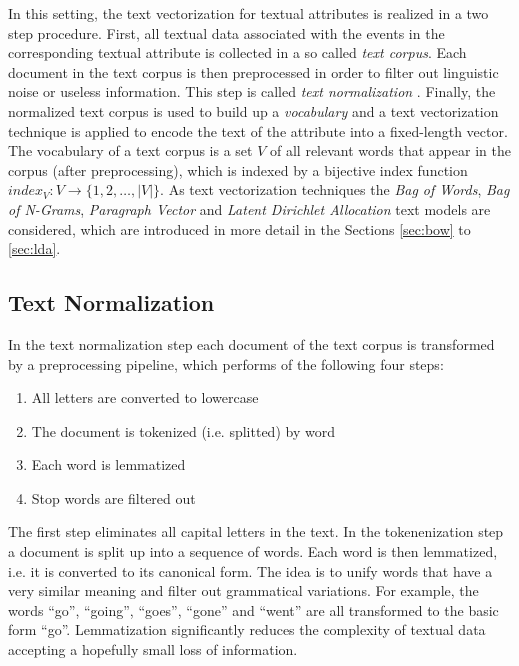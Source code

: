 In this setting, the text vectorization for textual attributes is realized in a two step procedure.
First, all textual data associated with the events in the corresponding textual attribute is collected in a so called \textit{text corpus}.
Each document in the text corpus is then preprocessed in order to filter out linguistic noise or useless information.
This step is called \textit{text normalization}  \cite{DBLP:books/lib/JurafskyM09}.
Finally, the normalized text corpus is used to build up a \textit{vocabulary} and a text vectorization technique is applied to encode the text of the attribute into a fixed-length vector.
The vocabulary of a text corpus is a set $V$ of all relevant words that appear in the corpus (after preprocessing), which is indexed by a bijective index function $index_V \colon V \to \{1, 2, \dots, |V|\}$.
As text vectorization techniques the \textit{Bag of Words}, \textit{Bag of N-Grams}, \textit{Paragraph Vector} and \textit{Latent Dirichlet Allocation} text models are considered, which are introduced in more detail in the Sections \ref{sec:bow} to \ref{sec:lda}.

\subsection{Text Normalization}

In the text normalization step each document of the text corpus is transformed by a preprocessing pipeline, which performs of the following four steps:
\begin{enumerate} 
	\item All letters are converted to lowercase
	\item The document is tokenized (i.e. splitted) by word
	\item Each word is lemmatized
	\item Stop words are filtered out
\end{enumerate}
The first step eliminates all capital letters in the text.
In the tokenenization step a document is split up into a sequence of words.
Each word is then lemmatized, i.e. it is converted to its canonical form.
The idea is to unify words that have a very similar meaning and filter out grammatical variations.
For example, the words   \enquote{go}, \enquote{going}, \enquote{goes}, \enquote{gone} and   \enquote{went} are all transformed to the basic form   \enquote{go}.
Lemmatization significantly reduces the complexity of textual data accepting a hopefully small loss of information.

